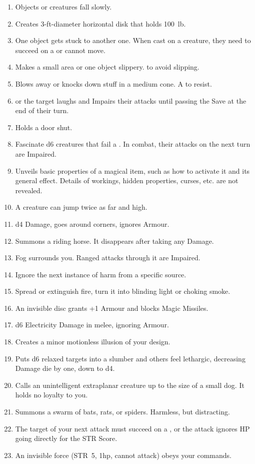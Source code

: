 \documentclass[itdr]{subfiles}
\begin{document}
\begin{enumerate}
	\item {} Objects or creatures fall slowly.
	\item {} Creates 3-ft-diameter horizontal disk that holds 100~lb.
	\item {} One object gets stuck to another one. When cast on a creature, they need to succeed on a  or cannot move.
	\item {} Makes a small area or one object slippery.  to avoid slipping.
	\item {} Blows away or knocks down stuff in a medium cone. A  to resist.
	\item {}  or the target laughs and Impairs their attacks until passing the Save at the end of their turn.
	\item {} Holds a door shut.
	\item {} Fascinate d6 creatures that fail a . In combat, their attacks on the next turn are Impaired.
	\item {} Unveils basic properties of a magical item, such as how to activate it and its general effect. Details of workings, hidden properties, curses, etc. are not revealed.
	\item {} A creature can jump twice as far and high.
	\item {} d4 Damage, goes around corners, ignores Armour.
	\item {} Summons a riding horse. It disappears after taking any Damage.
	\item {} Fog surrounds you. Ranged attacks through it are Impaired.
	\item {} Ignore the next instance of harm from a specific source.
	\item {} Spread or extinguish fire, turn it into blinding light or choking smoke.
	\item {} An invisible disc grants +1 Armour and blocks Magic Missiles.
	\item {} d6 Electricity Damage in melee, ignoring Armour.
	\item {} Creates a minor motionless \mbox{illusion} of your design.
	\item {} Puts d6 relaxed targets into a slumber and others feel lethargic, decreasing Damage die by one, down to d4.
	\item {} Calls an unintelligent extraplanar creature up to the size of a small dog. It holds no loyalty to you.
	\item {} Summons a swarm of bats, rats, or spiders. Harmless, but distracting.
	\item {} The target of your next attack must succeed on a , or the attack ignores HP going directly for the STR Score.
	\item {} An invisible force (STR~5, 1hp, cannot attack) obeys your commands.
\end{enumerate}
\end{document}
